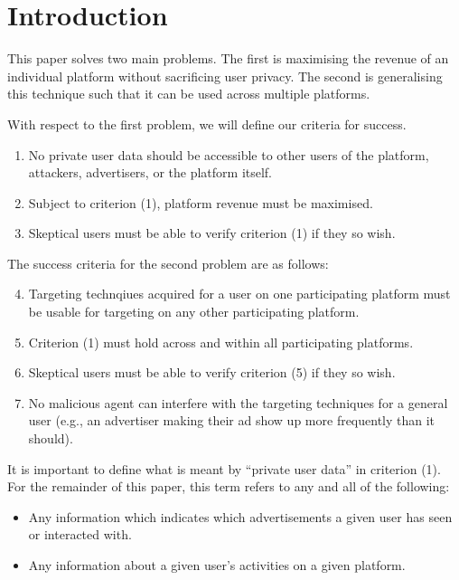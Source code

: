 \section{Introduction}
This paper solves two main problems. The first is maximising the revenue of an individual platform without sacrificing user privacy. The second is generalising this technique such that it can be used across multiple platforms.

With respect to the first problem, we will define our criteria for success.

\begin{enumerate}[(1)]
    \item No private user data should be accessible to other users of the platform, attackers, advertisers, or the platform itself.
    \item Subject to criterion (1), platform revenue must be maximised.
    \item Skeptical users must be able to verify criterion (1) if they so wish.
\end{enumerate}

The success criteria for the second problem are as follows:

\begin{enumerate}[(1)]
    \setcounter{enumi}{3}
    \item Targeting technqiues acquired for a user on one participating platform must be usable for targeting on any other participating platform.
    \item Criterion (1) must hold across and within all participating platforms.
    \item Skeptical users must be able to verify criterion (5) if they so wish.
    \item No malicious agent can interfere with the targeting techniques for a general user (e.g., an advertiser making their ad show up more frequently than it should).
\end{enumerate}

It is important to define what is meant by ``private user data'' in criterion (1). For the remainder of this paper, this term refers to any and all of the following:

\begin{itemize}
    \item Any information which indicates which advertisements a given user has seen or interacted with.
    \item Any information about a given user's activities on a given platform.
\end{itemize}

